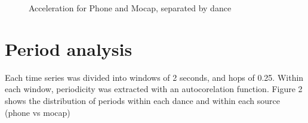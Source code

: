 \documentclass{article}
\begin{document}
\begin{figure}[t]
\noindent{}
\caption{Acceleration for Phone and Mocap, separated by dance}
\centering
\end{figure}

\section{Period analysis}

Each time series was divided into windows of 2 seconds, and hops of 0.25. Within each window, periodicity was extracted with an autocorelation function. Figure 2 shows the distribution of periods within each dance and within each source (phone vs mocap)
\end{document}
